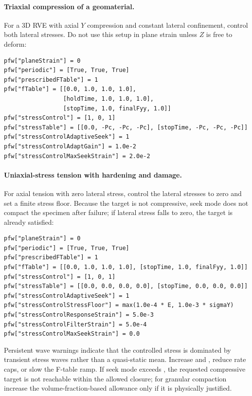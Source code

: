 \paragraph{Triaxial compression of a geomaterial.}
For a 3D RVE with axial $Y$ compression and constant lateral confinement, control
both lateral stresses.  Do not use this setup in plane strain unless $Z$ is free
to deform:
\begin{lstlisting}[caption={RVE triaxial compression with X/Z confining pressure.}]
pfw["planeStrain"] = 0
pfw["periodic"] = [True, True, True]
pfw["prescribedFTable"] = 1
pfw["fTable"] = [[0.0, 1.0, 1.0, 1.0],
                 [holdTime, 1.0, 1.0, 1.0],
                 [stopTime, 1.0, finalFyy, 1.0]]
pfw["stressControl"] = [1, 0, 1]
pfw["stressTable"] = [[0.0, -Pc, -Pc, -Pc], [stopTime, -Pc, -Pc, -Pc]]
pfw["stressControlAdaptiveSeek"] = 1
pfw["stressControlAdaptGain"] = 1.0e-2
pfw["stressControlMaxSeekStrain"] = 2.0e-2
\end{lstlisting}

\paragraph{Uniaxial-stress tension with hardening and damage.}
For axial tension with zero lateral stress, control the lateral stresses to zero
and set a finite stress floor.  Because the target is not compressive, seek mode
does not compact the specimen after failure; if lateral stress falls to zero,
the target is already satisfied:
\begin{lstlisting}[caption={Uniaxial-stress tension with zero lateral stress.}]
pfw["planeStrain"] = 0
pfw["periodic"] = [True, True, True]
pfw["prescribedFTable"] = 1
pfw["fTable"] = [[0.0, 1.0, 1.0, 1.0], [stopTime, 1.0, finalFyy, 1.0]]
pfw["stressControl"] = [1, 0, 1]
pfw["stressTable"] = [[0.0, 0.0, 0.0, 0.0], [stopTime, 0.0, 0.0, 0.0]]
pfw["stressControlAdaptiveSeek"] = 1
pfw["stressControlStressFloor"] = max(1.0e-4 * E, 1.0e-3 * sigmaY)
pfw["stressControlResponseStrain"] = 5.0e-3
pfw["stressControlFilterStrain"] = 5.0e-4
pfw["stressControlMaxSeekStrain"] = 0.0
\end{lstlisting}

Persistent wave warnings indicate that the controlled stress is dominated by
transient stress waves rather than a quasi-static mean.  Increase
 and ,
reduce rate caps, or slow the F-table ramp.  If seek mode exceeds
, the requested compressive target is not
reachable within the allowed closure; for granular compaction increase the
volume-fraction-based allowance only if it is physically justified.

